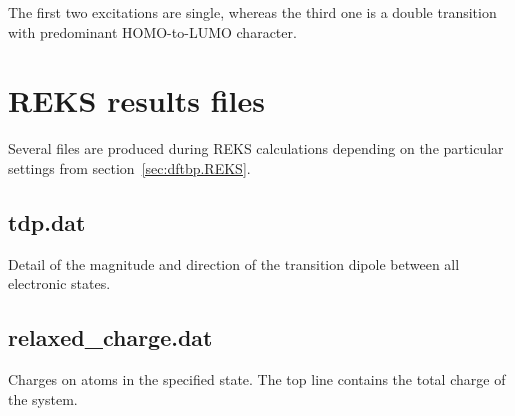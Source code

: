 The first two excitations are single, whereas the third one is a
double transition with predominant HOMO-to-LUMO character.

\section{REKS results files}
\label{sec:reks_files}
Several files are produced during REKS calculations depending on the
particular settings from section~\ref{sec:dftbp.REKS}.


\subsection{tdp.dat}

Detail of the magnitude and direction of the transition dipole between all electronic states.

\subsection{relaxed\_charge.dat}

Charges on atoms in the specified state. The top line contains the total charge of the system.


